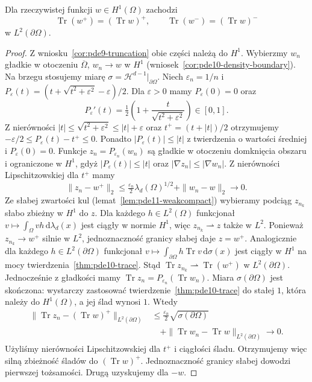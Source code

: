 \begin{lemat}
\label{lem:pde13-trace-parts}
Dla rzeczywistej funkcji $w\in H^1(\Omega)$ zachodzi
\[
 \operatorname{Tr}(w^+)=(\operatorname{Tr}w)^+,\qquad
 \operatorname{Tr}(w^-)=(\operatorname{Tr}w)^-
\]
w $L^2(\partial\Omega)$.
\end{lemat}
\begin{proof}
Z wniosku~\ref{cor:pde9-truncation} obie części należą do $H^1$.
Wybierzmy $w_n$ gładkie w otoczeniu $\overline\Omega$,
$w_n\to w$ w $H^1$ (wniosek~\ref{cor:pde10-density-boundary}).
Na brzegu stosujemy miarę
$\sigma=\mathcal H^{d-1}|_{\partial\Omega}$.
Niech $\varepsilon_n=1/n$ i
$P_\varepsilon(t)=(t+\sqrt{t^2+\varepsilon^2}-\varepsilon)/2$.
Dla $\varepsilon>0$ mamy $P_\varepsilon(0)=0$ oraz
\[
 P_\varepsilon'(t)=\tfrac12
 \left(1+\frac{t}{\sqrt{t^2+\varepsilon^2}}\right)\in[0,1].
\]
Z nierówności $|t|\le\sqrt{t^2+\varepsilon^2}\le|t|+\varepsilon$
oraz $t^+=(t+|t|)/2$ otrzymujemy
$-\varepsilon/2\le P_\varepsilon(t)-t^+\le0$.
Ponadto $|P_\varepsilon(t)|\le|t|$ z twierdzenia o wartości
średniej i $P_\varepsilon(0)=0$.
Funkcje $z_n=P_{\varepsilon_n}(w_n)$ są gładkie w otoczeniu
domknięcia obszaru i ograniczone w $H^1$, gdyż
$|P_\varepsilon(t)|\le|t|$ oraz
$|\nabla z_n|\le|\nabla w_n|$.
Z nierówności Lipschitzowskiej dla $t^+$ mamy
\[
 \|z_n-w^+\|_2
 \le \tfrac{\varepsilon_n}{2}\lambda_d(\Omega)^{1/2}
 +\|w_n-w\|_2\longrightarrow0.
\]
Ze słabej zwartości kul (lemat~\ref{lem:pde11-weakcompact})
wybieramy podciąg $z_{n_k}$ słabo zbieżny w $H^1$ do $z$.
Dla każdego $h\in L^2(\Omega)$ funkcjonał
$v\mapsto\int_\Omega vh\,\mathrm d\lambda_d(x)$ jest
ciągły w normie $H^1$, więc $z_{n_k}\rightharpoonup z$
także w $L^2$. Ponieważ $z_{n_k}\to w^+$ silnie w $L^2$,
jednoznaczność granicy słabej daje $z=w^+$.
Analogicznie dla każdego $h\in L^2(\partial\Omega)$
funkcjonał $v\mapsto\int_{\partial\Omega}h\operatorname{Tr}v\,
\mathrm d\sigma(x)$ jest ciągły w $H^1$ na mocy
twierdzenia~\ref{thm:pde10-trace}. Stąd
$\operatorname{Tr}z_{n_k}\rightharpoonup\operatorname{Tr}(w^+)$
w $L^2(\partial\Omega)$.
Jednocześnie z gładkości mamy
$\operatorname{Tr}z_n=P_{\varepsilon_n}(\operatorname{Tr}w_n)$.
Miara $\sigma(\partial\Omega)$ jest skończona: wystarczy
zastosować twierdzenie~\ref{thm:pde10-trace} do stałej $1$,
która należy do $H^1(\Omega)$, a jej ślad wynosi $1$.
Wtedy
\begin{align*}
 \|\operatorname{Tr}z_n-(\operatorname{Tr}w)^+\|_{L^2(\partial\Omega)}
 &\le \tfrac{\varepsilon_n}{2}\sqrt{\sigma(\partial\Omega)}\\
 &\quad+\|\operatorname{Tr}w_n-\operatorname{Tr}w\|_{L^2(\partial\Omega)}
 \longrightarrow0.
\end{align*}
Użyliśmy nierówności Lipschitzowskiej dla $t^+$ i ciągłości
śladu. Otrzymujemy więc silną zbieżność śladów do
$(\operatorname{Tr}w)^+$. Jednoznaczność granicy słabej
dowodzi pierwszej tożsamości. Drugą uzyskujemy dla $-w$.
\end{proof}

